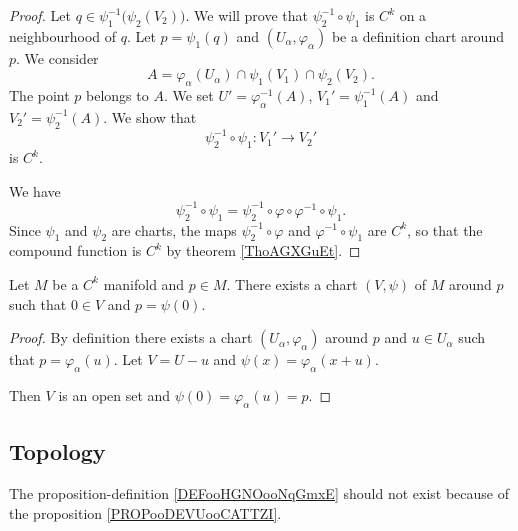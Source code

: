 \begin{proof}
	Let \( q\in \psi_1^{-1}\big( \psi_2(V_2) \big)\). We will prove that \( \psi_2^{-1}\circ\psi_1\) is \( C^k\) on a neighbourhood of \( q\).  Let \( p=\psi_1(q)\) and \( (U_{\alpha},\varphi_{\alpha})\) be a definition chart around \( p\). We consider
	\begin{equation}
		A=\varphi_{\alpha}(U_{\alpha})\cap\psi_1(V_1)\cap\psi_2(V_2).
	\end{equation}
	The point \( p\) belongs to \( A\). We set \( U'=\varphi_{\alpha}^{-1}(A)\), \( V_1'=\psi_1^{-1}(A)\) and \( V_2'=\psi_2^{-1}(A)\). We show that
	\begin{equation}
		\psi_2^{-1}\circ\psi_1\colon V_1'\to V_2'
	\end{equation}
	is \( C^k\).

	We have
	\begin{equation}
		\psi_2^{-1}\circ\psi_1=\psi_2^{-1}\circ\varphi\circ\varphi^{-1}\circ\psi_1.
	\end{equation}
	Since \( \psi_1\) and \( \psi_2\) are charts, the maps \( \psi_2^{-1}\circ \varphi\) and \( \varphi^{-1}\circ\psi_1\) are \( C^k\), so that the compound function is \( C^k\) by theorem \ref{ThoAGXGuEt}.
\end{proof}

\begin{lemma}       \label{LEMooOPPJooXezOHS}
	Let \( M\) be a \( C^k\) manifold and \( p\in M\). There exists a chart \( (V,\psi)\) of \( M\) around \( p\) such that \( 0\in V\) and \( p=\psi(0)\).
\end{lemma}

\begin{proof}
	By definition there exists a chart \( (U_{\alpha},\varphi_{\alpha})\) around \( p\) and \( u\in U_{\alpha}\) such that \( p=\varphi_{\alpha}(u)\). Let \( V=U-u\) and \( \psi(x)=\varphi_{\alpha}(x+u)\).

	Then \( V\) is an open set and \( \psi(0)=\varphi_{\alpha}(u)=p\).
\end{proof}

\subsection{Topology}

\begin{probleme}  \label{PROBooGNZMooFknpBn}
	The proposition-definition \ref{DEFooHGNOooNqGmxE} should not exist because of the proposition \ref{PROPooDEVUooCATTZI}.
\end{probleme}

